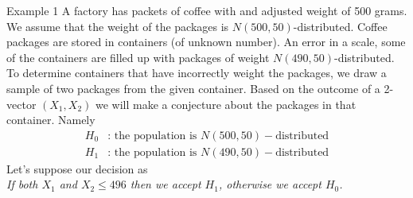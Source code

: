 \documentclass{beamer}
\begin{document}
\begin{frame}{Example 1}
	A factory has packets of coffee with and adjusted weight of 500 grams. We assume that the weight of the packages is $N(500,50)$-distributed. Coffee packages are stored in containers (of unknown number). An error in a scale, some of the containers are filled up with packages of weight $N(490,50)$-distributed. To determine containers that have incorrectly weight the packages, we draw a sample of two packages from the given container. Based on the outcome of a 2-vector $(X_1,X_2)$ we will make a conjecture about the packages in that container. Namely
	\begin{equation*}
		\begin{split}
			H_0 & \text{: the population is } N(500,50)-\text{distributed}\\
			H_1 & \text{: the population is } N(490,50)-\text{distributed}
		\end{split}
	\end{equation*}
	Let's suppose our decision as\\
	\textit{If both $X_1$ and $X_2 \le 496$ then we accept $H_1$, otherwise we accept $H_0$. }
\end{frame}
\end{document}
